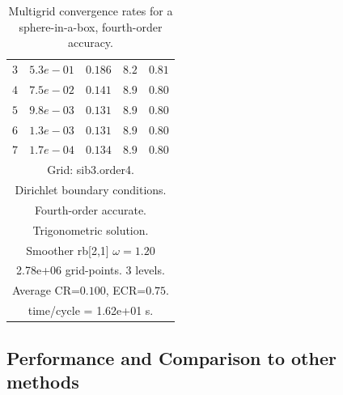 \documentclass{article}
\begin{document}
\begin{table}[hbt]
\begin{center}
{\begin{tabular}{|c|c|c|c|c|}
 $ 3$  & $ 5.3e-01$ & $0.186$ & $ 8.2$ & $0.81$ \\ 
 $ 4$  & $ 7.5e-02$ & $0.141$ & $ 8.9$ & $0.80$ \\ 
 $ 5$  & $ 9.8e-03$ & $0.131$ & $ 8.9$ & $0.80$ \\ 
 $ 6$  & $ 1.3e-03$ & $0.131$ & $ 8.9$ & $0.80$ \\ 
 $ 7$  & $ 1.7e-04$ & $0.134$ & $ 8.9$ & $0.80$ \\ 
\hline 
\multicolumn{5}{|c|}{Grid: sib3.order4.}  \\
\multicolumn{5}{|c|}{Dirichlet boundary conditions.}  \\
\multicolumn{5}{|c|}{Fourth-order accurate.}  \\
\multicolumn{5}{|c|}{Trigonometric solution.}  \\
\multicolumn{5}{|c|}{Smoother rb[2,1] $\omega=1.20$}  \\
\multicolumn{5}{|c|}{2.78e+06 grid-points. 3 levels.}  \\
\multicolumn{5}{|c|}{Average CR=$0.100$, ECR=$0.75$.}  \\
\multicolumn{5}{|c|}{time/cycle = 1.62e+01 s.}  \\
\hline 
\end{tabular}
} %
\end{center}
\caption{Multigrid convergence rates for a sphere-in-a-box, fourth-order accuracy.}
\label{fig:sibII}
\end{table}


\clearpage
\subsection{Performance and Comparison to other methods}











\printindex
\end{document}
